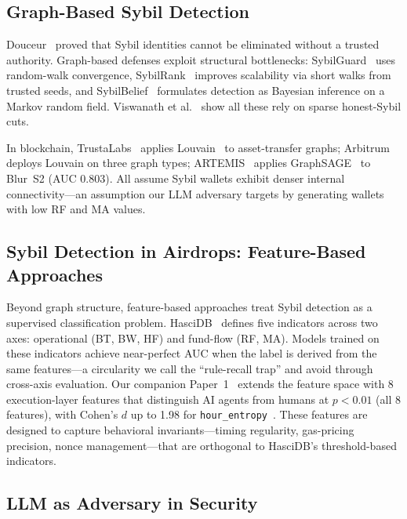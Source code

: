 \documentclass[sigconf,nonacm=false]{acmart}
\begin{document}
\subsection{Graph-Based Sybil Detection}

Douceur~\cite{douceur2002sybil} proved that Sybil identities cannot be eliminated without a trusted authority. Graph-based defenses exploit structural bottlenecks: SybilGuard~\cite{yu2006sybilguard} uses random-walk convergence, SybilRank~\cite{cao2012sybilrank} improves scalability via short walks from trusted seeds, and SybilBelief~\cite{gong2014sybilbelief} formulates detection as Bayesian inference on a Markov random field. Viswanath et al.~\cite{viswanath2010} show all these rely on sparse honest-Sybil cuts.

In blockchain, TrustaLabs~\cite{trustalabs} applies Louvain~\cite{blondel2008louvain} to asset-transfer graphs; Arbitrum~\cite{arbitrum} deploys Louvain on three graph types; ARTEMIS~\cite{artemis} applies GraphSAGE~\cite{hamilton2017graphsage} to Blur~S2 (AUC 0.803). All assume Sybil wallets exhibit denser internal connectivity---an assumption our LLM adversary targets by generating wallets with low RF and MA values.

\subsection{Sybil Detection in Airdrops: Feature-Based Approaches}

Beyond graph structure, feature-based approaches treat Sybil detection as a supervised classification problem.
HasciDB~\cite{hascidb2026} defines five indicators across two axes: operational (BT, BW, HF) and fund-flow (RF, MA).
Models trained on these indicators achieve near-perfect AUC when the label is derived from the same features---a circularity we call the ``rule-recall trap'' and avoid through cross-axis evaluation.
Our companion Paper~1~\cite{wen2026agent} extends the feature space with 8 execution-layer features that distinguish AI agents from humans at $p < 0.01$ (all 8 features), with Cohen's $d$ up to 1.98 for \texttt{hour\_entropy}~\cite{cohen1988}.
These features are designed to capture behavioral invariants---timing regularity, gas-pricing precision, nonce management---that are orthogonal to HasciDB's threshold-based indicators.

\subsection{LLM as Adversary in Security}
\end{document}
